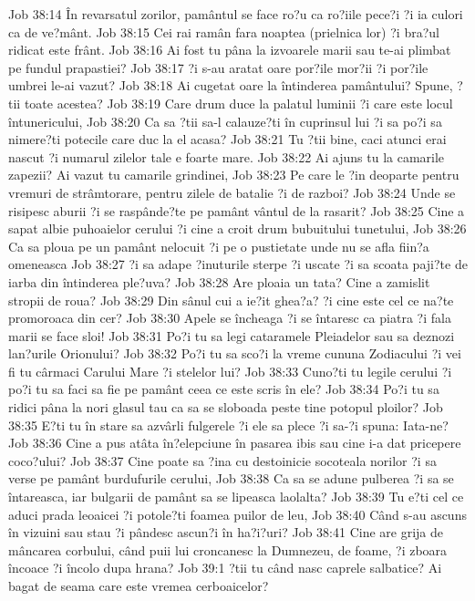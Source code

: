 Job 38:14  În revarsatul zorilor, pamântul se face ro?u ca ro?iile pece?i ?i ia culori ca de ve?mânt.
Job 38:15  Cei rai ramân fara noaptea (prielnica lor) ?i bra?ul ridicat este frânt.
Job 38:16  Ai fost tu pâna la izvoarele marii sau te-ai plimbat pe fundul prapastiei?
Job 38:17  ?i s-au aratat oare por?ile mor?ii ?i por?ile umbrei le-ai vazut?
Job 38:18  Ai cugetat oare la întinderea pamântului? Spune, ?tii toate acestea?
Job 38:19  Care drum duce la palatul luminii ?i care este locul întunericului,
Job 38:20  Ca sa ?tii sa-l calauze?ti în cuprinsul lui ?i sa po?i sa nimere?ti potecile care duc la el acasa?
Job 38:21  Tu ?tii bine, caci atunci erai nascut ?i numarul zilelor tale e foarte mare.
Job 38:22  Ai ajuns tu la camarile zapezii? Ai vazut tu camarile grindinei,
Job 38:23  Pe care le ?in deoparte pentru vremuri de strâmtorare, pentru zilele de batalie ?i de razboi?
Job 38:24  Unde se risipesc aburii ?i se raspânde?te pe pamânt vântul de la rasarit?
Job 38:25  Cine a sapat albie puhoaielor cerului ?i cine a croit drum bubuitului tunetului,
Job 38:26  Ca sa ploua pe un pamânt nelocuit ?i pe o pustietate unde nu se afla fiin?a omeneasca
Job 38:27  ?i sa adape ?inuturile sterpe ?i uscate ?i sa scoata paji?te de iarba din întinderea ple?uva?
Job 38:28  Are ploaia un tata? Cine a zamislit stropii de roua?
Job 38:29  Din sânul cui a ie?it ghea?a? ?i cine este cel ce na?te promoroaca din cer?
Job 38:30  Apele se încheaga ?i se întaresc ca piatra ?i fala marii se face sloi!
Job 38:31  Po?i tu sa legi cataramele Pleiadelor sau sa deznozi lan?urile Orionului?
Job 38:32  Po?i tu sa sco?i la vreme cununa Zodiacului ?i vei fi tu cârmaci Carului Mare ?i stelelor lui?
Job 38:33  Cuno?ti tu legile cerului ?i po?i tu sa faci sa fie pe pamânt ceea ce este scris în ele?
Job 38:34  Po?i tu sa ridici pâna la nori glasul tau ca sa se sloboada peste tine potopul ploilor?
Job 38:35  E?ti tu în stare sa azvârli fulgerele ?i ele sa plece ?i sa-?i spuna: Iata-ne?
Job 38:36  Cine a pus atâta în?elepciune în pasarea ibis sau cine i-a dat pricepere coco?ului?
Job 38:37  Cine poate sa ?ina cu destoinicie socoteala norilor ?i sa verse pe pamânt burdufurile cerului,
Job 38:38  Ca sa se adune pulberea ?i sa se întareasca, iar bulgarii de pamânt sa se lipeasca laolalta?
Job 38:39  Tu e?ti cel ce aduci prada leoaicei ?i potole?ti foamea puilor de leu,
Job 38:40  Când s-au ascuns în vizuini sau stau ?i pândesc ascun?i în ha?i?uri?
Job 38:41  Cine are grija de mâncarea corbului, când puii lui croncanesc la Dumnezeu, de foame, ?i zboara încoace ?i încolo dupa hrana?
Job 39:1  ?tii tu când nasc caprele salbatice? Ai bagat de seama care este vremea cerboaicelor?
